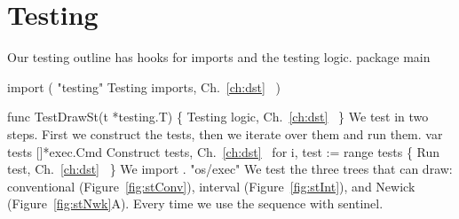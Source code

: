 \section{Testing}
Our testing outline has hooks for imports and the testing logic.
\nwenddocs{}\endmoddef\nwstartdeflinemarkup\nwenddeflinemarkup
package main

import (
          "testing"
          \LA{}Testing imports, Ch.~\ref{ch:dst}~{\nwtagstyle{}}\RA{}
)

func TestDrawSt(t *testing.T) \{
          \LA{}Testing logic, Ch.~\ref{ch:dst}~{\nwtagstyle{}}\RA{}
\}
\nwendcode{}\nwdocspar
We test in two steps. First we construct the tests, then we iterate
over them and run them.
\nwenddocs{}\endmoddef\nwstartdeflinemarkup{}\nwenddeflinemarkup
var tests []*exec.Cmd
\LA{}Construct tests, Ch.~\ref{ch:dst}~{\nwtagstyle{}}\RA{}
for i, test := range tests \{
          \LA{}Run test, Ch.~\ref{ch:dst}~{\nwtagstyle{}}\RA{}
\}
\nwendcode{}\nwdocspar
We import .
\nwenddocs{}\endmoddef\nwstartdeflinemarkup{}\nwenddeflinemarkup
"os/exec"
\nwendcode{}\nwdocspar
We test the three trees that  can draw: conventional
(Figure~\ref{fig:stConv}), interval (Figure~\ref{fig:stInt}), and
Newick (Figure~\ref{fig:stNwk}A). Every time we use the sequence
 with sentinel.
\nwenddocs{}\endmoddef\nwstartdeflinemarkup{}\nwenddeflinemarkup

